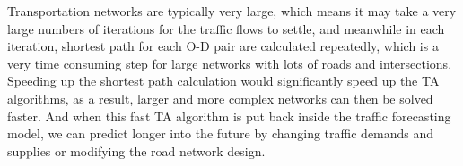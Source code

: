 Transportation networks are typically very large,
which means it may take a very large numbers of iterations
for the traffic flows to settle,
and meanwhile in each iteration,
shortest path for each O-D pair are calculated repeatedly,
which is a very time consuming step for large networks with lots of roads and intersections.
Speeding up the shortest path calculation would significantly speed up the TA algorithms,
as a result,
larger and more complex networks can then be solved faster.
And when this fast TA algorithm is put back inside the traffic forecasting model,
we can predict longer into the future by changing traffic demands and supplies or modifying the road network design.


\begin{comment}
The existing algorithm is referred as the label-correcting algorithm, 
it is modified and implemented as the well known label-setting Dijkstra's algorithm using a special data structure for storing information,
A* algorithm is them implemented to speed the Dijkstra's algorithm for the point to point shortest problem.

\marginpar{zone\\no\\travel}
Special cares are taken when implementing these algorithms,
namely the origins and destinations mentioned sometimes do not act as intersections for the travellers (to be included in the shortest path calculation),
since these origins and destinations are conceptual traffic zones for generating demands and supplies.
\end{comment}
